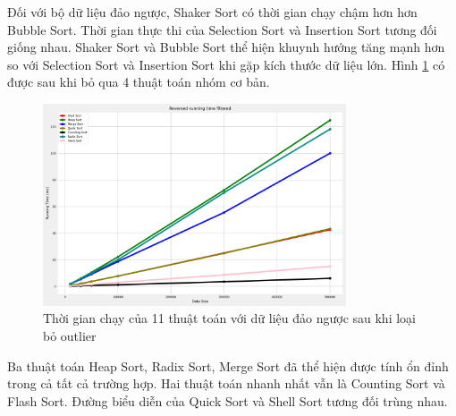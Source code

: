 Đối với bộ dữ liệu đảo ngược, Shaker Sort có thời gian chạy chậm hơn hơn Bubble Sort. Thời gian thực thi của Selection Sort và Insertion Sort tương đối giống nhau. Shaker Sort và Bubble Sort thể hiện khuynh hướng tăng mạnh hơn so với Selection Sort và Insertion Sort khi gặp kích thước dữ liệu lớn. Hình \ref{fig:reversed_running_time_filtered} có được sau khi bỏ qua 4 thuật toán nhóm cơ bản.

\begin{figure}[H]
    \centering
    \includegraphics[width=0.8\textwidth]{experimental_result/images/reversed_running_time_filtered.png}
    \caption{Thời gian chạy của 11 thuật toán với dữ liệu đảo ngược sau khi loại bỏ outlier}
    \label{fig:reversed_running_time_filtered}
\end{figure}


Ba thuật toán Heap Sort, Radix Sort, Merge Sort đã thể hiện được tính ổn đỉnh trong cả tất cả trường hợp. Hai thuật toán nhanh nhất vẫn là Counting Sort và Flash Sort. Đường biểu diễn của Quick Sort và Shell Sort tương đối trùng nhau.








